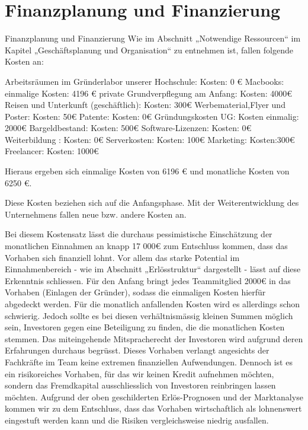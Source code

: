\chapter{Finanzplanung und Finanzierung}

Finanzplanung und Finanzierung
Wie im Abschnitt „Notwendige Ressourcen“ im Kapitel „Geschäftsplanung und Organisation“ zu entnehmen ist, fallen folgende Kosten an:


Arbeitsräumen im Gründerlabor unserer Hochschule: Kosten: 0 €
Macbooks: einmalige Kosten:  4196 €
private Grundverpflegung am Anfang:  Kosten: 4000€
Reisen und Unterkunft  (geschäftlich):  Kosten: 300€
Werbematerial,Flyer und Poster: Kosten: 50€
Patente: Kosten: 0€
Gründungskosten UG: Kosten einmalig: 2000€
Bargeldbestand: Kosten: 500€
Software-Lizenzen: Kosten: 0€
Weiterbildung : Kosten: 0€
Serverkosten: Kosten: 100€
Marketing: Kosten:300€
Freelancer: Kosten: 1000€

Hieraus ergeben sich einmalige Kosten von 6196 € und monatliche Kosten von 6250 €.

Diese Kosten beziehen sich auf die Anfangsphase. Mit der Weiterentwicklung des Unternehmens fallen neue bzw. andere Kosten an.

Bei diesem Kostensatz lässt die durchaus pessimistische Einschätzung der monatlichen Einnahmen an knapp 17 000€ zum Entschluss kommen, dass das Vorhaben sich finanziell lohnt. Vor allem das starke Potential im Einnahmenbereich - wie im Abschnitt „Erlösstruktur“ dargestellt - lässt auf diese Erkenntnis schliessen.
Für den Anfang bringt jedes Teammitglied 2000€ in das Vorhaben (Einlagen der Gründer), sodass die einmaligen Kosten hierfür abgedeckt werden. Für die monatlich anfallenden Kosten wird es allerdings schon schwierig. Jedoch sollte es bei diesen verhältnismässig kleinen Summen möglich sein, Investoren gegen eine Beteiligung zu finden, die die monatlichen Kosten stemmen. Das miteingehende Mitspracherecht der Investoren wird aufgrund deren Erfahrungen durchaus begrüsst. Dieses Vorhaben verlangt angesichts der Fachkräfte im Team keine extremen finanziellen Aufwendungen. Dennoch ist es ein risikoreiches Vorhaben, für das wir keinen Kredit aufnehmen möchten, sondern das Fremdkapital ausschliesslich von Investoren reinbringen lassen möchten. Aufgrund der oben geschilderten Erlös-Prognosen und der Marktanalyse kommen wir zu dem Entschluss, dass das Vorhaben wirtschaftlich als lohnenswert eingestuft werden kann und die Risiken vergleichsweise niedrig ausfallen.

